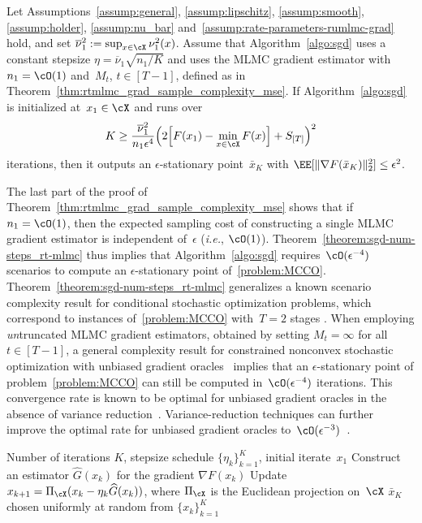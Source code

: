 \documentclass[11pt]{article}
\let\hat\widehat
\begin{document}
\begin{theorem}
\label{theorem:sgd-num-steps_rt-mlmc}
Let Assumptions~\ref{assump:general}, \ref{assump:lipschitz}, \ref{assump:smooth}, \ref{assump:holder}, \ref{assump:nu_bar} and~\ref{assump:rate-parameters-rumlmc-grad} hold, and set $\overline{\nu}_1^2:=\sup_{x\in\cX} \nu_1^2(x)$. Assume that Algorithm~\ref{algo:sgd} uses a constant stepsize $\eta=\overline{\nu}_1 \sqrt{n_1/K}$ and uses the MLMC gradient estimator with~$n_1=\cO(1)$ and~$M_t$, $t\in[T-1]$, defined as in Theorem~\ref{thm:rtmlmc_grad_sample_complexity_mse}. If Algorithm~\ref{algo:sgd} is initialized at~$x_1\in\cX$ and runs over
\begin{align*}
    K\geq \frac{\overline{\nu}_1^2}{n_1\epsilon^4} \Big(2 \Big[F(x_1)-\min_{x\in\cX}F(x) \Big]+S_{[T]} \Big)^2 
\end{align*}
iterations, then it outputs an $\epsilon$-stationary point~$\bar x_K$ with $\EE[\|\nabla F(\bar{x}_K)\|^2_2] \leq \epsilon^2$. 
\end{theorem}

The last part of the proof of Theorem~\ref{thm:rtmlmc_grad_sample_complexity_mse} shows that if $n_1 = \cO(1)$, then the expected sampling cost of constructing a single MLMC gradient estimator is independent of~$\epsilon$ (\textit{i.e.}, $\cO(1)$). Theorem~\ref{theorem:sgd-num-steps_rt-mlmc} thus implies that Algorithm~\ref{algo:sgd} requires~$\cO(\epsilon^{-4})$ scenarios to compute an $\epsilon$-stationary point of~\eqref{problem:MCCO}. Theorem~\ref{theorem:sgd-num-steps_rt-mlmc} generalizes a known scenario complexity result for conditional stochastic optimization problems, which correspond to instances of~\eqref{problem:MCCO} with~$T=2$ stages \citep[Corollary~4.1]{hu2021bias}. When employing {\em un}truncated MLMC gradient estimators, obtained by setting $M_t = \infty$ for all $t \in [T-1]$, a general complexity result for constrained nonconvex stochastic optimization with unbiased gradient oracles~\citep[Corollary~4]{ghadimi2016mini} implies that an $\epsilon$-stationary point of problem~\eqref{problem:MCCO} can still be computed in~$\cO(\epsilon^{-4})$ iterations. This convergence rate is known to be optimal for unbiased gradient oracles in the absence of variance reduction~\citep{arjevani2023lower}. Variance-reduction techniques can further improve the optimal rate for unbiased gradient oracles to~$\cO(\epsilon^{-3})$~\citep{arjevani2023lower}.


\begin{algorithm}
\caption{Projected SGD}\label{algo:sgd}
\begin{algorithmic}
\Require Number of iterations $K$, stepsize schedule $\{\eta_k\}_{k=1}^K$, initial iterate~$x_1$
\State Construct an estimator $\hat{G}(x_k)$ for the gradient $\nabla F(x_k)$
\State Update $x_{k+1}=\Pi_\cX (x_k-\eta_k\hat{G}(x_k))$, where $\Pi_\cX$ is the Euclidean projection on~$\cX$
\EndFor
\Ensure $\bar{x}_K$ chosen uniformly at random from  $\{x_k\}_{k=1}^K$
\end{algorithmic}
\end{algorithm}
\end{document}
